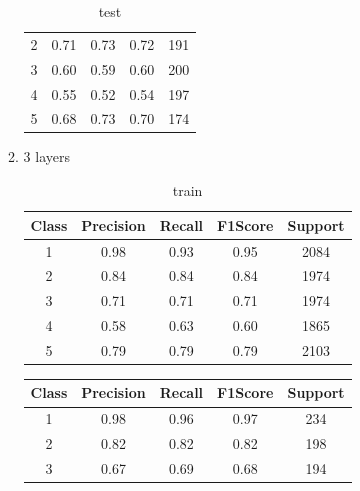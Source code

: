 \begin{enumerate}[label=(\alph*)]
\begin{enumerate}[label=\roman*.]
\begin{table}[!htb]
\begin{tabular}{ccccc}
                            2     & 0.71      & 0.73   & 0.72    & 191     \\
                            3     & 0.60      & 0.59   & 0.60    & 200     \\
                            4     & 0.55      & 0.52   & 0.54    & 197     \\
                            5     & 0.68      & 0.73   & 0.70    & 174     \\ \hline
                        \end{tabular}
                        \caption{test}
                        \label{part e test depth 2}
                    \end{table}
              \item 3 layers
                    \begin{table}[!htb]
                        \centering
                        \begin{tabular}{ccccc}
                            \hline
                            Class & Precision & Recall & F1Score & Support \\ \hline
                            1     & 0.98      & 0.93   & 0.95    & 2084    \\
                            2     & 0.84      & 0.84   & 0.84    & 1974    \\
                            3     & 0.71      & 0.71   & 0.71    & 1974    \\
                            4     & 0.58      & 0.63   & 0.60    & 1865    \\
                            5     & 0.79      & 0.79   & 0.79    & 2103    \\ \hline
                        \end{tabular}
                        \caption{train}
                        \label{part e train depth 3}
                    \end{table}
                    \begin{table}[!htb]
                        \centering
                        \begin{tabular}{ccccc}
                            \hline
                            Class & Precision & Recall & F1Score & Support \\ \hline
                            1     & 0.98      & 0.96   & 0.97    & 234     \\
                            2     & 0.82      & 0.82   & 0.82    & 198     \\
                            3     & 0.67      & 0.69   & 0.68    & 194     \\

\end{tabular}
\end{table}
\end{enumerate}
\end{enumerate}
